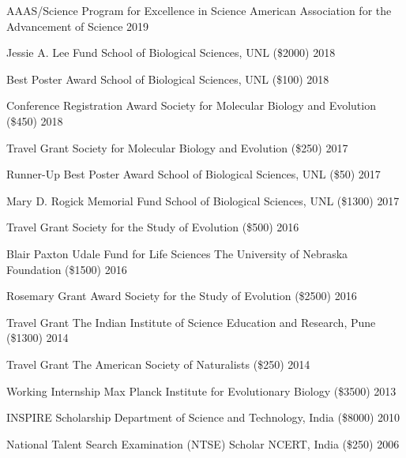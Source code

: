 
\begin{cvhonors}

  \cvhonor
    {AAAS/Science Program for Excellence in Science}
    {American Association for the Advancement of Science}
    {2019}
    {}

  \cvhonor
    {Jessie A. Lee Fund} 
    {School of Biological Sciences, UNL (\$2000)}
    {2018} %
    {}

  \cvhonor
    {Best Poster Award}
    {School of Biological Sciences, UNL (\$100)}
    {2018}
    {}

  \cvhonor
    {Conference Registration Award}
    {Society for Molecular Biology and Evolution (\$450)}
    {2018}
    {}

  \cvhonor
    {Travel Grant}
    {Society for Molecular Biology and Evolution (\$250)}
    {2017}
    {}

  \cvhonor
    {Runner-Up Best Poster Award}
    {School of Biological Sciences, UNL (\$50)}
    {2017}
    {}

  \cvhonor
    {Mary D. Rogick Memorial Fund}
    {School of Biological Sciences, UNL (\$1300)}
    {2017}
    {}

  \cvhonor
    {Travel Grant}
    {Society for the Study of Evolution (\$500)}
    {2016}
    {}

  \cvhonor
    {Blair Paxton Udale Fund for Life Sciences}
    {The University of Nebraska Foundation (\$1500)}
    {2016}
    {}

  \cvhonor
    {Rosemary Grant Award}
    {Society for the Study of Evolution (\$2500)}
    {2016}
    {}

  \cvhonor
    {Travel Grant}
    {The Indian Institute of Science Education and Research, Pune (\$1300)}
    {2014}
    {}

  \cvhonor
    {Travel Grant}
    {The American Society of Naturalists (\$250)}
    {2014}
    {}

  \cvhonor
    {Working Internship}
    {Max Planck Institute for Evolutionary Biology (\$3500)}
    {2013}
    {}

  \cvhonor
    {INSPIRE Scholarship}
    {Department of Science and Technology, India (\$8000)}
    {2010}
    {}

  \cvhonor
    {National Talent Search Examination (NTSE) Scholar}
    {NCERT, India (\$250)}
    {2006}
    {}
\end{cvhonors}
